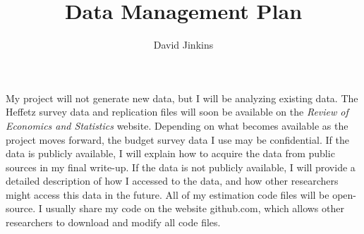 \documentclass[a4paper,10pt]{article}
\title{Data Management Plan}
\author{David Jinkins}
\begin{document}
\maketitle

My project will not generate new data, but I will be analyzing existing data.  The Heffetz survey data and replication files will soon be available on the \emph{Review of Economics and Statistics} website.  Depending on what becomes available as the project moves forward, the budget survey data I use may be confidential. If the data is publicly available, I will explain how to acquire the data from public sources in my final write-up.  If the data is not publicly available, I will provide a detailed description of how I accessed to the data, and how other researchers might access this data in the future.  All of my estimation code files will be open-source.  I usually share my code on the website github.com, which allows other researchers to download and modify all code files.  
\end{document}
